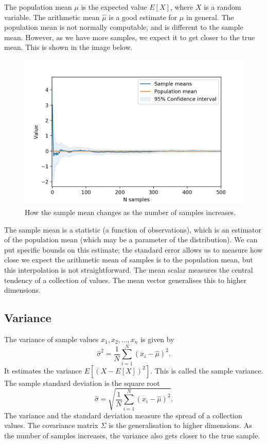 \documentclass[a4paper, openany]{memoir}
\begin{document}
The population mean $\mu$ is the expected value $E[X]$, where $X$ is a random variable. The arithmetic mean $\hat{\mu}$ is a good estimate for $\mu$ in general. The population mean is not normally computable, and is different to the sample mean. However, as we have more samples, we expect it to get closer to the true mean. This is shown in the image below.
\begin{figure}[H]
    \centering
    \includegraphics[scale=0.7]{src/5.25 pop_mean.png}
    \caption{How the sample mean changes as the number of samples increases.}
\end{figure}
The sample mean is a statistic (a function of observations), which is an estimator of the population mean (which may be a parameter of the distribution). We can put specific bounds on this estimate; the standard error allows us to measure how close we expect the arithmetic mean of samples is to the population mean, but this interpolation is not straightforward.
The mean scalar measures the central tendency of a collection of values. The mean vector generalises this to higher dimensions.

\subsection{Variance}
The variance of sample values $x_1, x_2, \dots, x_n$ is given by
\[\hat{\sigma}^2 = \frac{1}{N} \sum_{i=1}^N (x_i - \hat{\mu})^2.\]
It estimates the variance $E[(X - E[X])^2]$. This is called the sample variance. The sample standard deviation is the square root
\[\hat{\sigma} = \sqrt{\frac{1}{N} \sum_{i=1}^N (x_i - \hat{\mu})^2}.\]
The variance and the standard deviation measure the spread of a collection values. The covariance matrix $\Sigma$ is the generalisation to higher dimensions. As the number of samples increases, the variance also gets closer to the true sample.
\end{document}
